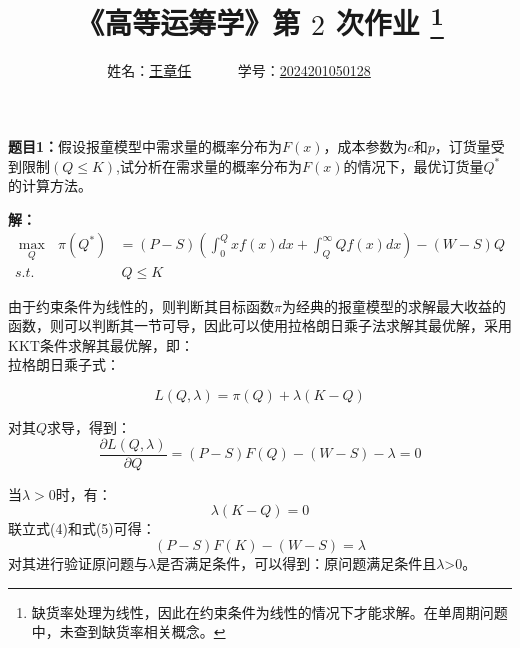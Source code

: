 \documentclass[12pt,a4paper]{article}
\begin{document}
\title{
{\heiti《高等运筹学》第 {$2$} 次作业
\footnote{
 缺货率处理为线性，因此在约束条件为线性的情况下才能求解。在单周期问题中，未查到缺货率相关概念。
}
}
}
\date{}

\author{
姓名：\underline{王章任}~~~~~~
学号：\underline{2024201050128}~~~~~~}

\maketitle

\noindent
\section*{\heiti \color{red}{报童模型拓展}}
\noindent
{\bf 题目1：}假设报童模型中需求量的概率分布为$F(x)$，成本参数为$c$和$p$，订货量受到限制$(Q\leq K)$,试分析在需求量的概率分布为$F(x)$的情况下，最优订货量$Q^*$的计算方法。



\vspace{5pt}
\noindent
{\bf 解：}
\begin{align}
    \max_Q\text{\ }\pi \left( Q^{*} \right) &=\left( P-S \right) \left( \int_0^Q{xf\left( x \right) dx+\int_Q^{\infty}{Qf\left( x \right) dx}} \right) -\left( W-S \right) Q \\
    s.t.&\ Q\le K
\end{align}


由于约束条件为线性的，则判断其目标函数$\pi $为经典的报童模型的求解最大收益的函数，则可以判断其一节可导，因此可以使用拉格朗日乘子法求解其最优解，采用KKT条件求解其最优解，即：\\
拉格朗日乘子式：

\begin{equation}
    L\left( Q,\lambda  \right) =\pi \left( Q \right) +\lambda \left( K-Q \right)
\end{equation}

对其$Q$求导，得到：
\begin{equation}
    \frac{\partial L\left( Q,\lambda  \right)}{\partial Q} =\left( P-S \right) F\left( Q\right) -\left( W-S \right) -\lambda =0
\end{equation}

当$\lambda >0$时，有：
\begin{equation}
    \lambda \left( K-Q \right) =0   
\end{equation}
联立式(4)和式(5)可得：
\begin{equation}
    \left( P-S \right) F\left( K\right) -\left( W-S \right) =\lambda              
\end{equation}
对其进行验证原问题与$\lambda$是否满足条件，可以得到：原问题满足条件且$\lambda$>0。
\end{document}
